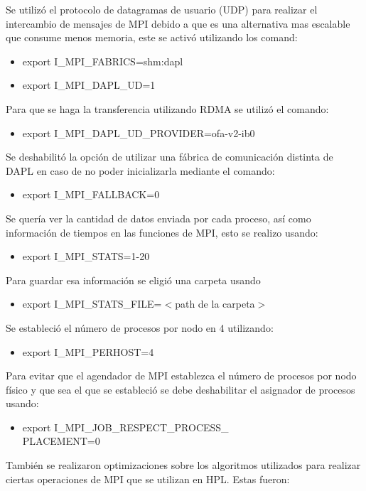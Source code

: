 \documentclass[conference,compsoc]{IEEEtran}
\begin{document}
Se utilizó el protocolo de datagramas de usuario (UDP) para realizar el intercambio de mensajes de MPI debido a que es una alternativa mas escalable que consume menos memoria, este se activó utilizando los comand:\cite{hpl_params_intel}
\begin{itemize}
    \item export I\_MPI\_FABRICS=shm:dapl
    \item export I\_MPI\_DAPL\_UD=1
\end{itemize}
Para que se haga la transferencia utilizando RDMA se utilizó el comando:
\begin{itemize}
    \item export I\_MPI\_DAPL\_UD\_PROVIDER=ofa-v2-ib0
\end{itemize}
Se deshabilitó la opción de utilizar una fábrica de comunicación distinta de DAPL en caso de no poder inicializarla mediante el comando:
\begin{itemize}
    \item export I\_MPI\_FALLBACK=0
\end{itemize}
Se quería ver la cantidad de datos enviada por cada proceso, así como información de tiempos en las funciones de MPI, esto se realizo usando:
\begin{itemize}
    \item export I\_MPI\_STATS=1-20
\end{itemize}
Para guardar esa información se eligió una carpeta usando
\begin{itemize}
    \item export I\_MPI\_STATS\_FILE=$<$path de la carpeta$>$
\end{itemize}
Se estableció el número de procesos por nodo en 4 utilizando:
\begin{itemize}
    \item export I\_MPI\_PERHOST=4
\end{itemize}
Para evitar que el agendador de MPI establezca el número de procesos por nodo físico y que sea el que se estableció se debe deshabilitar el asignador de procesos usando:
\begin{itemize}
    \item export I\_MPI\_JOB\_RESPECT\_PROCESS\_\\PLACEMENT=0
\end{itemize}
También se realizaron optimizaciones sobre los algoritmos utilizados para realizar ciertas operaciones de MPI que se utilizan en HPL. Estas fueron:
\end{document}
